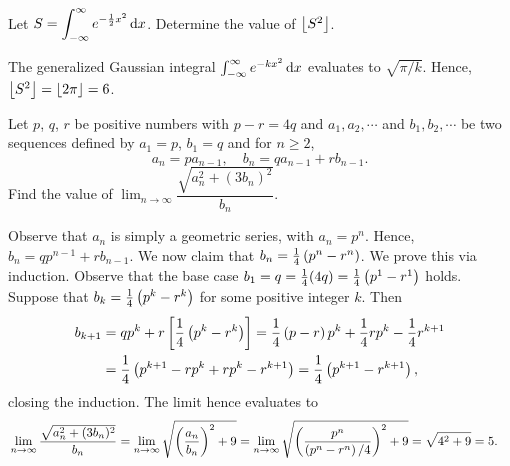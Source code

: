 \begin{question}[6]\label{Q::2021-O-1-24}
    Let $S = \displaystyle\int_{-\infty}^\infty e^{-\frac12 x^2} \mathop{\mathrm{d}x}$. Determine the value of $\left\lfloor S^2 \right\rfloor$.
\end{question}
\begin{solution*}
    The generalized Gaussian integral $\int_{-\infty}^\infty e^{-k x^2} \mathop{\mathrm{d}x}$ evaluates to $\sqrt{\pi/k}$. Hence, $\left\lfloor S^2 \right\rfloor = \left\lfloor 2\pi \right\rfloor = 6$.
\end{solution*}

\begin{question}[5]\label{Q::2021-O-1-25}
    Let $p$, $q$, $r$ be positive numbers with $p-r= 4q$ and $a_1, a_2, \cdots$ and $b_1, b_2, \cdots$ be two sequences defined by $a_1 = p$, $b_1 = q$ and for $n \geq 2$, \[a_n = pa_{n-1}, \quad b_n = qa_{n-1} + rb_{n-1}.\] Find the value of $\displaystyle\lim_{n \to \infty} \dfrac{\sqrt{a_n^2 + (3b_n)^2}}{b_n}$.
\end{question}
\begin{solution*}
    Observe that $a_n$ is simply a geometric series, with $a_n = p^n$. Hence, $b_n = qp^{n-1} + rb_{n-1}$. We now claim that $b_n = \frac14 \left( p^n - r^n \right)$. We prove this via induction. Observe that the base case $b_1 = q = \frac14 (4q) = \frac14 \left( p^1 - r^1 \right)$ holds. Suppose that $b_k = \frac14 \left( p^k - r^k \right)$ for some positive integer $k$. Then
    \begin{align*}
        b_{k+1} &= qp^{k} + r\left[ \frac14 \left( p^k - r^k \right) \right] = \frac14 \left( p-r \right) p^{k} + \frac14 r p^k - \frac14 r^{k+1}\\&= \frac14 \left( p^{k+1} - rp^{k} + rp^k - r^{k+1} \right) = \frac14 \left( p^{k+1} - r^{k+1} \right),
    \end{align*}
    closing the induction. The limit hence evaluates to
    \begin{align*}
        &\lim_{n \to \infty} \dfrac{\sqrt{a_n^2 + (3b_n)^2}}{b_n} = \lim_{n \to \infty} \sqrt{\left( \frac{a_n}{b_n} \right)^2 + 9} = \lim_{n \to \infty} \sqrt{\left( \frac{p^n}{\left( p^n - r^n \right)/4} \right)^2 + 9} = \sqrt{4^2 + 9} = 5.
    \end{align*}
\end{solution*}